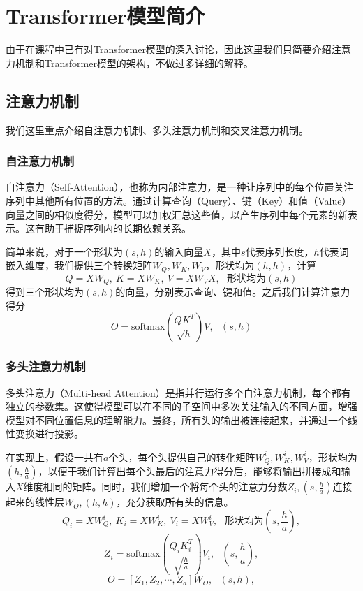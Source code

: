 \section{Transformer模型简介}\label{sec-3}

由于在课程中已有对Transformer模型的深入讨论，因此这里我们只简要介绍注意力机制和Transformer模型的架构，不做过多详细的解释。

\subsection{注意力机制}

我们这里重点介绍自注意力机制、多头注意力机制和交叉注意力机制。

\subsubsection{自注意力机制}

自注意力（Self-Attention），也称为内部注意力，是一种让序列中的每个位置关注序列中其他所有位置的方法。通过计算查询（Query）、键（Key）和值（Value）向量之间的相似度得分，模型可以加权汇总这些值，以产生序列中每个元素的新表示。这有助于捕捉序列内的长期依赖关系。

简单来说，对于一个形状为$(s,h)$的输入向量$X$，其中$s$代表序列长度，$h$代表词嵌入维度，我们提供三个转换矩阵$W_Q,W_K,W_V$，形状均为$(h,h)$，计算
$$
Q = XW_Q , \ 
K = XW_K , \ 
V = XW_V X, \ \ \ \text{形状均为}(s, h)
$$
得到三个形状均为$(s,h)$的向量，分别表示查询、键和值。之后我们计算注意力得分
$$
O = \text{softmax}(\frac{QK^T}{\sqrt{h}}) V, \ \ \ (s,h)
$$

\subsubsection{多头注意力机制}
多头注意力（Multi-head Attention）是指并行运行多个自注意力机制，每个都有独立的参数集。这使得模型可以在不同的子空间中多次关注输入的不同方面，增强模型对不同位置信息的理解能力。最终，所有头的输出被连接起来，并通过一个线性变换进行投影。

在实现上，假设一共有$a$个头，每个头提供自己的转化矩阵$W_Q^i,W_K^i,W_V^i$，形状均为$(h, \frac{h}{a})$，以便于我们计算出每个头最后的注意力得分后，能够将输出拼接成和输入$X$维度相同的矩阵。同时，我们增加一个将每个头的注意力分数$Z_i,(s,\frac{h}{a})$连接起来的线性层$W_O,(h,h)$，充分获取所有头的信息。
$$
Q_i = XW_Q^i , \ 
K_i = XW_K^i , \ 
V_i = XW_V^i ,  \ \ \ \text{形状均为}(s, \frac{h}{a}),
$$
$$
Z_i = \text{softmax}(\frac{Q_iK_i^T}{\sqrt{\frac{h}{a}}}) V_i, \ \ \  (s, \frac{h}{a}),
$$
$$
O = [Z_1, Z_2,\cdots , Z_a] W_O,  \ \ \ (s, h),
$$

